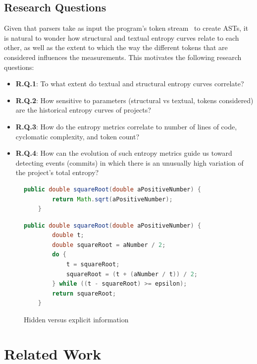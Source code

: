 \documentclass[10pt,conference]{IEEEtran}
\begin{document}
\subsection{Research Questions}
Given that parsers take as input the program's token stream~\cite{Parr10language} to create ASTs, it is natural to wonder how structural and textual entropy curves relate to each other, as well as the extent to which the way the different tokens that are considered influences the measurements. This motivates the following research questions:

\begin{itemize}
    \item \textbf{R.Q.1}: To what extent do textual and structural entropy curves correlate?
    \item \textbf{R.Q.2}: How sensitive to parameters (structural vs textual, tokens considered) are the historical entropy curves of projects?
    \item \textbf{R.Q.3}: How do the entropy metrics correlate to number of lines of code, cyclomatic complexity, and token count?
    \item \textbf{R.Q.4}: How can the evolution of such entropy metrics guide us toward detecting events (commits) in which there is an unusually high variation of the project's total entropy?
\end{itemize}

\begin{figure}
  \begin{lstlisting}[language=Java,numbers=none]
    public double squareRoot(double aPositiveNumber) {
        return Math.sqrt(aPositiveNumber);
    }
  \end{lstlisting}
  \begin{lstlisting}[language=Java, numbers=none]
    public double squareRoot(double aPositiveNumber) {
        double t;
        double squareRoot = aNumber / 2;
        do {
            t = squareRoot;
            squareRoot = (t + (aNumber / t)) / 2;
        } while ((t - squareRoot) >= epsilon);
        return squareRoot;
    }
  \end{lstlisting}
  \caption{Hidden versus explicit information}
  \label{intro-snippet}
\end{figure}

\section{Related Work} \label{literature_review}
\end{document}
